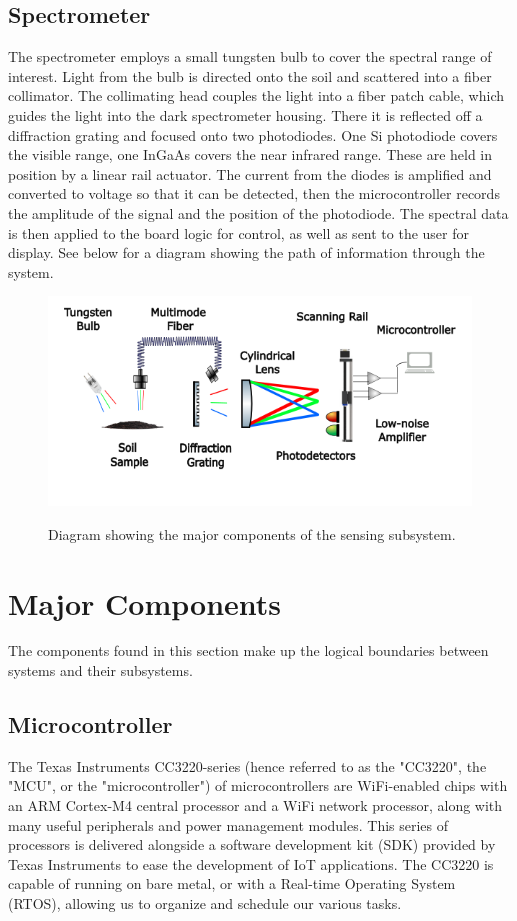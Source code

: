 \documentclass[journal]{IEEEtran}
\begin{document}
\subsection{Spectrometer} 
The spectrometer employs a small tungsten bulb to cover the spectral range of interest. Light from the bulb 
is directed onto the soil and scattered into a fiber collimator. The collimating head couples the light into 
a fiber patch cable, which guides the light into the dark spectrometer housing. There it is reflected off a 
diffraction grating and focused onto two photodiodes. One Si photodiode covers the visible range, one InGaAs 
covers the near infrared range. These are held in position by a linear rail actuator. The current from the 
diodes is amplified and converted to voltage so that it can be detected, then the microcontroller records the 
amplitude of the signal and the position of the photodiode. The spectral data is then applied to the board logic 
for control, as well as sent to the user for display. See below for a diagram showing the path of information 
through the system.
\begin{figure}[H]
    \centering
    \includegraphics[width=\linewidth]{images/Schematic Diagram 2.png}
    \label{fig:sensing-block}
    \caption{Diagram showing the major components of the sensing subsystem.}
\end{figure}
\section{Major Components} \label{sec:major-components}
The components found in this section make up the logical boundaries between systems and their
subsystems.
\subsection{Microcontroller}
The Texas Instruments CC3220-series (hence referred to as the "CC3220", the "MCU", or the "microcontroller") of microcontrollers are WiFi-enabled chips with an ARM Cortex-M4 central processor and a WiFi network processor, along with many useful peripherals and power management modules. This series of processors is delivered alongside a software development kit (SDK) provided by Texas Instruments to ease the development of IoT applications. The CC3220 is capable of running on bare metal, or with a Real-time Operating System (RTOS), allowing us to organize and schedule our various tasks.
\end{document}
